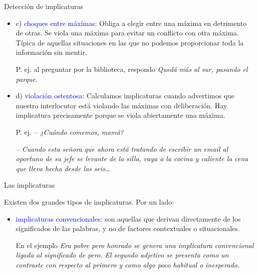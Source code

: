 \documentclass{beamer}
\begin{document}
\begin{frame}{Detección de implicaturas}

	\begin{itemize}
		\item c) \textcolor{blue}{choques entre máximas}: Obliga a elegir entre una máxima en detrimento de otras. Se viola una máxima para evitar un conflicto con otra máxima. Típica de aquellas situaciones en las que no podemos proporcionar toda la información sin mentir.
		
		P. ej. al preguntar por la biblioteca, respondo \it{Quedá más al sur, pasando el parque}.
		
		\item d) \textcolor{blue}{violación ostentosa}: Calculamos implicaturas cuando advertimos que nuestro interlocutor está violando las máximas con deliberación. Hay implicatura precisamente porque se viola abiertamente una máxima. 

		P. ej. \it{-- ¿Cuándo comemos, mamá?}
		
		\it{-- Cuando esta señora que ahora está tratando de escribir un email al oportuno de su jefe se levante de la silla, vaya a la cocina y caliente la cena que lleva hecha desde las seis\ldots}

	\end{itemize}

\end{frame}

\begin{frame}{Las implicaturas}

	Existen dos grandes tipos de implicaturas. Por un lado:
	
	\begin{itemize}
		\item \textcolor{blue}{implicaturas convencionales}: son aquellas que derivan directamente de los significados de las palabras, y no de factores contextuales o situacionales.

		\vspace{0.5cm}
				
		En el ejemplo \it{Era pobre pero honrado} se genera una implicatura convencional ligada al significado de \it{pero}. El segundo adjetivo se presenta como un contraste con respecto al primero y como algo poco habitual o inesperado.
		
	\end{itemize}

\end{frame}
\end{document}
